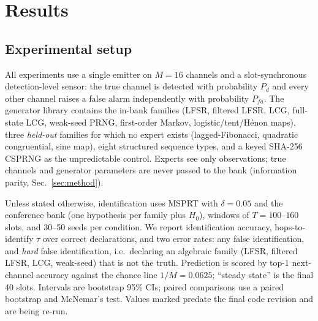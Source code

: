 %

\section{Results}
\label{sec:results}

\subsection{Experimental setup}
\label{sec:setup}

All experiments use a single emitter on $M=16$ channels and a slot-synchronous
detection-level sensor: the true channel is detected with probability $P_d$ and
every other channel raises a false alarm independently with probability $P_{fa}$.
The generator library contains the in-bank families (LFSR, filtered LFSR, LCG,
full-state LCG, weak-seed PRNG, first-order Markov, logistic/tent/H\'enon maps),
three \emph{held-out} families for which no expert exists (lagged-Fibonacci,
quadratic congruential, sine map), eight structured sequence types, and a keyed
SHA-256 CSPRNG as the unpredictable control. Experts see only observations; true
channels and generator parameters are never passed to the bank (information
parity, Sec.~\ref{sec:method}).

Unless stated otherwise, identification uses MSPRT with $\delta=0.05$ and the
conference bank (one hypothesis per family plus $H_0$), windows of $T=100$--$160$
slots, and 30--50 seeds per condition. We report identification accuracy,
hops-to-identify $\tau$ over correct declarations, and two error rates: any
false identification, and \emph{hard} false identification, i.e.\ declaring an
algebraic family (LFSR, filtered LFSR, LCG, weak-seed) that is not the truth.
Prediction is scored by top-1 next-channel accuracy against the chance line
$1/M=0.0625$; ``steady state'' is the final 40 slots. Intervals are bootstrap
95\% CIs; paired comparisons use a paired bootstrap and McNemar's test.
Values marked \stale{} predate the final code revision and are being re-run.

